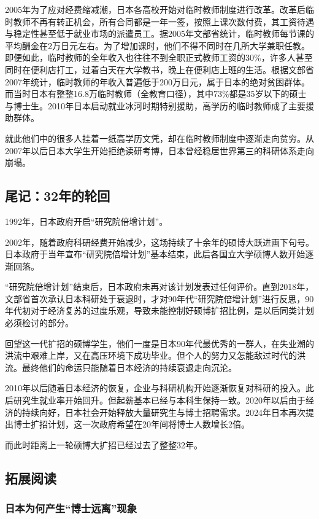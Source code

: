 2005年为了应对经费缩减潮，日本各高校开始对临时教师制度进行改革。改革后临时教师不再有转正机会，所有合同都是一年一签，按照上课次数付费，其工资待遇与稳定性甚至低于就业市场的派遣员工。据2005年文部省统计，临时教师每节课的平均酬金在2万日元左右。为了增加课时，他们不得不同时在几所大学兼职任教。即便如此，临时教师的全年收入也往往不到全职正式教师工资的30\%，许多人甚至同时在便利店打工，过着白天在大学教书，晚上在便利店上班的生活。根据文部省2007年统计，临时教师的年收入普遍低于200万日元，属于日本的绝对贫困群体。而当时日本有整整16.8万临时教师（全教育口径），其中73\%都是35岁以下的硕士与博士生。2010年日本启动就业冰河时期特别援助，高学历的临时教师成了主要援助群体。

就此他们中的很多人挂着一纸高学历文凭，却在临时教师制度中逐渐走向贫穷。从2007年以后日本大学生开始拒绝读研考博，日本曾经稳居世界第三的科研体系走向崩塌。

\subsection{尾记：32年的轮回}

1992年，日本政府开启“研究院倍增计划”。

2002年，随着政府科研经费开始减少，这场持续了十余年的硕博大跃进画下句号。日本政府于当年宣布“研究院倍增计划”基本结束，此后各国立大学硕博人数开始逐渐回落。

“研究院倍增计划”结束后，日本政府未再对该计划发表过任何评价。直到2018年，文部省首次承认日本科研处于衰退时，才对90年代“研究院倍增计划”进行反思，90年代初对于经济复苏的过度乐观，导致未能控制好硕博扩招比例，是以后同类计划必须检讨的部分。

回望这一代扩招的硕博学生，他们一度是日本90年代最优秀的一群人，在失业潮的洪流中艰难上岸，又在高压环境下成功毕业。但个人的努力又怎能敌过时代的洪流。最终他们的命运只能随着日本经济的持续衰退走向沉沦。

2010年以后随着日本经济的恢复，企业与科研机构开始逐渐恢复对科研的投入。此后研究生就业率开始回升。但起薪基本已经与本科生保持一致。2020年以后由于经济的持续向好，日本社会开始释放大量研究生与博士招聘需求。2024年日本再次提出博士扩招计划，这一次政府希望在20年间将博士人数增长2倍。

而此时距离上一轮硕博大扩招已经过去了整整32年。

\subsection{拓展阅读}

\subsubsection{日本为何产生“博士远离”现象}

